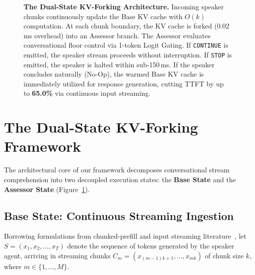 \documentclass{article}
\begin{document}
\begin{figure}[t]
{%
}
\caption{\textbf{The Dual-State KV-Forking Architecture.} Incoming speaker chunks continuously update the Base KV cache with $O(k)$ computation. At each chunk boundary, the KV cache is forked (0.02\,ms overhead) into an Assessor branch. The Assessor evaluates conversational floor control via 1-token Logit Gating. If \texttt{CONTINUE} is emitted, the speaker stream proceeds without interruption. If \texttt{STOP} is emitted, the speaker is halted within sub-150\,ms. If the speaker concludes naturally (No-Op), the warmed Base KV cache is immediately utilized for response generation, cutting TTFT by up to \textbf{65.0\%} via continuous input streaming.}
\label{fig:dual_state_arch}
\end{figure}

\section{The Dual-State KV-Forking Framework}

The architectural core of our framework decomposes conversational stream comprehension into two decoupled execution states: the \textbf{Base State} and the \textbf{Assessor State} (Figure~\ref{fig:dual_state_arch}).

\subsection{Base State: Continuous Streaming Ingestion}
Borrowing formulations from chunked-prefill and input streaming literature~\citep{xiao2023streamingllm, agrawal2023sarathi}, let $S = (x_1, x_2, \dots, x_T)$ denote the sequence of tokens generated by the speaker agent, arriving in streaming chunks $C_m = (x_{(m-1)k + 1}, \dots, x_{mk})$ of chunk size $k$, where $m \in \{1, \dots, M\}$.
\end{document}
